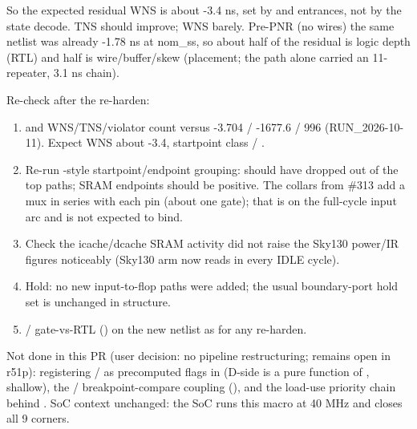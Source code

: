 \begin{record}
{}

So the expected residual WNS is about -3.4 ns, set by 
and  entrances, not by the state decode. TNS should
improve; WNS barely. Pre-PNR (no wires) the same netlist was already
-1.78 ns at nom\_ss, so about half of the residual is logic depth (RTL)
and half is wire/\allowbreak{}buffer/\allowbreak{}skew (placement; the
 path alone carried an 11-repeater, 3.1 ns chain).

Re-check after the re-harden:

\begin{enumerate}
\def\labelenumi{\arabic{enumi}.}
\tightlist
\item
   and 
  WNS/\allowbreak{}TNS/\allowbreak{}violator count versus -3.704 /
  -1677.6 / 996 (RUN\_\allowbreak{}2026-10-11). Expect WNS about -3.4,
  startpoint class  / .
\item
  Re-run -style startpoint/\allowbreak{}endpoint
  grouping:  should have dropped out of the top
  paths; SRAM  endpoints should be positive. The collars from
  \#313 add a  mux in series with each pin (about one
  gate); that is on the full-cycle input arc and is not expected to
  bind.
\item
  Check the icache/\allowbreak{}dcache SRAM  activity did not
  raise the Sky130 power/IR figures noticeably (Sky130 arm now reads in
  every IDLE cycle).
\item
  Hold: no new input-to-flop paths were added; the usual boundary-port
  hold set is unchanged in structure.
\item
   / gate-vs-RTL
  () on the new netlist as for any re-harden.
\end{enumerate}

Not done in this PR (user decision: no pipeline restructuring; remains
open in r51p): registering  /
 as precomputed flags in 
(D-side is a pure function of , shallow), the
 /  breakpoint-compare coupling
(), and the load-use priority chain
behind . SoC context unchanged: the SoC runs this
macro at 40 MHz and closes all 9 corners.

\end{record}


